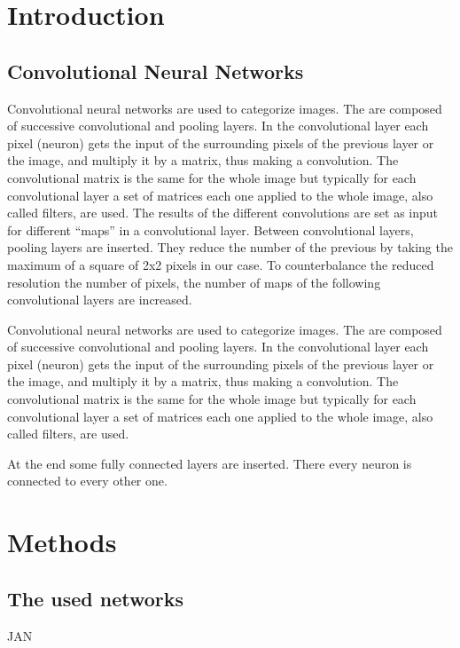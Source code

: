 \documentclass[%
 reprint,
 amsmath,amssymb,
 aps,
]{revtex4-1}
\begin{document}

\section{Introduction}


\subsection{Convolutional Neural Networks}

Convolutional neural networks are used to categorize images. The are composed of successive convolutional and pooling layers. In the convolutional layer each pixel (neuron) gets the input of the surrounding pixels of the previous layer or the image, and multiply it by a matrix, thus making a convolution. The convolutional matrix is the same for the whole image but typically for each convolutional layer a set of matrices each one applied to the whole image, also called filters, are used. The results of the different convolutions are set as input for different ``maps'' in a convolutional layer. Between convolutional layers, pooling layers are inserted. They reduce the number of the previous by taking the maximum of a square of 2x2 pixels in our case. To counterbalance the reduced resolution the number of pixels, the number of maps of the following convolutional layers are increased.

Convolutional neural networks are used to categorize images. The are composed of successive convolutional and pooling layers. In the convolutional layer each pixel (neuron) gets the input of the surrounding pixels of the previous layer or the image, and multiply it by a matrix, thus making a convolution. The convolutional matrix is the same for the whole image but typically for each convolutional layer a set of matrices each one applied to the whole image, also called filters, are used.

At the end some fully connected layers are inserted. There every neuron is connected to every other one.

\section{Methods}

\subsection{The used networks}

JAN
\end{document}

